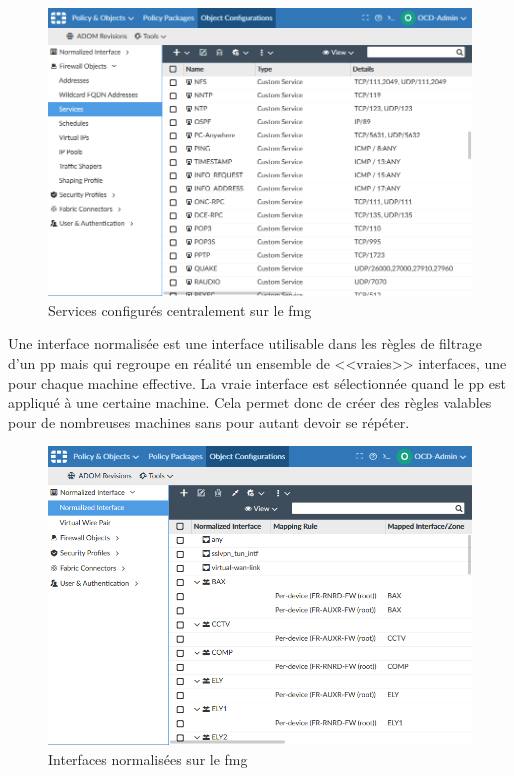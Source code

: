 \documentclass[12pt, oneside, a4paper, titlepage]{report}
\begin{document}
\begin{figure}[h!]
    \centering
    \includegraphics[width = \linewidth]{img/fmg/services.png}
    \caption{Services configurés centralement sur le \acrlong{fmg}}%
    \label{fig:fmg/services}
\end{figure}

Une interface normalisée est une interface utilisable dans les règles de
filtrage d'un \gls{pp} mais qui regroupe en réalité un ensemble de <<vraies>>
interfaces, une pour chaque machine effective.  La vraie interface est
sélectionnée quand le \gls{pp} est appliqué à une certaine machine. Cela permet
donc de créer des règles valables pour de nombreuses machines sans pour autant
devoir se répéter.

\begin{figure}[h!]
    \centering
    \includegraphics[width = \linewidth]{img/fmg/interfaces.png}
    \caption{Interfaces normalisées sur le \acrlong{fmg}}%
    \label{fig:fmg/interfaces}
\end{figure}
\end{document}
